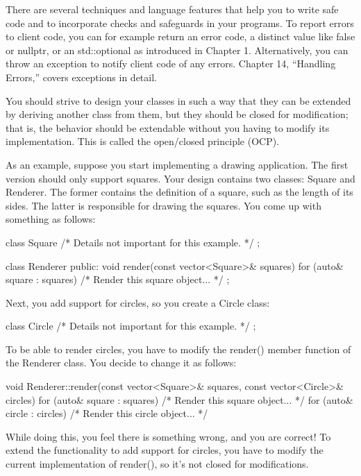There are several techniques and language features that help you to write safe code and to incorporate checks and safeguards in your programs. To report errors to client code, you can for example return an error code, a distinct value like false or nullptr, or an std::optional as introduced in Chapter 1. Alternatively, you can throw an exception to notify client code of any errors. Chapter 14, “Handling Errors,” covers exceptions in detail.


You should strive to design your classes in such a way that they can be extended by deriving another class from them, but they should be closed for modification; that is, the behavior should be extendable without you having to modify its implementation. This is called the open/closed principle (OCP).

As an example, suppose you start implementing a drawing application. The first version should only support squares. Your design contains two classes: Square and Renderer. The former contains the definition of a square, such as the length of its sides. The latter is responsible for drawing the squares.
You come up with something as follows:

\begin{cpp}
class Square { /* Details not important for this example. */ };

class Renderer
{
    public:
    void render(const vector<Square>& squares)
    {
        for (auto& square : squares) { /* Render this square object... */ }
    }
};
\end{cpp}

Next, you add support for circles, so you create a Circle class:

\begin{cpp}
class Circle { /* Details not important for this example. */ };
\end{cpp}

To be able to render circles, you have to modify the render() member function of the Renderer class. You decide to change it as follows:

\begin{cpp}
void Renderer::render(const vector<Square>& squares,
    const vector<Circle>& circles)
{
    for (auto& square : squares) { /* Render this square object... */ }
    for (auto& circle : circles) { /* Render this circle object... */ }
}
\end{cpp}

While doing this, you feel there is something wrong, and you are correct! To extend the functionality to add support for circles, you have to modify the current implementation of render(), so it’s not closed for modifications.

